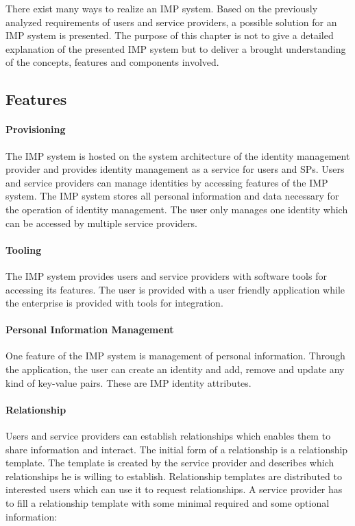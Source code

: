 There exist many ways to realize an IMP system. Based on the previously analyzed requirements of users and service providers, a possible solution for an IMP system is presented. The purpose of this chapter is not to give a detailed explanation of the presented IMP system but to deliver a brought understanding of the concepts, features and components involved.

\subsection{Features}

\paragraph{Provisioning} The IMP system is hosted on the system architecture of the identity management provider and provides identity management as a service for users and SPs. Users and service providers can manage identities by accessing features of the IMP system. The IMP system stores all personal information and data necessary for the operation of identity management. The user only manages one identity which can be accessed by multiple service providers.

\paragraph{Tooling} The IMP system provides users and service providers with software tools for accessing its features. The user is provided with a user friendly application while the enterprise is provided with tools for integration.

\paragraph{Personal Information Management} One feature of the IMP system is management of personal information. Through the application, the user can create an identity and add, remove and update any kind of key-value pairs. These are IMP identity attributes.

\paragraph{Relationship} 

Users and service providers can establish relationships which enables them to share information and interact. The initial form of a relationship is a relationship template. The template is created by the service provider and describes which relationships he is willing to establish. Relationship templates are distributed to interested users which can use it to request relationships. A service provider has to fill a relationship template with some minimal required and some optional information:

